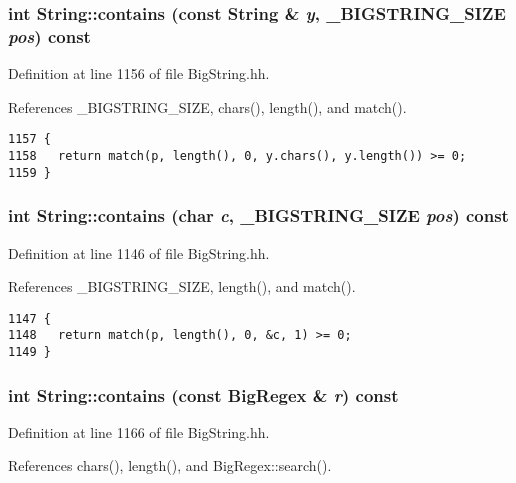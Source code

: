 \subsubsection{\setlength{\rightskip}{0pt plus 5cm}int String::contains (const String \& {\em y}, {\bf \_\-BIGSTRING\_\-SIZE} {\em pos}) const\hspace{0.3cm}{\tt  [inline]}}\label{classString_a38}




Definition at line 1156 of file Big\-String.hh.

References \_\-BIGSTRING\_\-SIZE, chars(), length(), and match().



\footnotesize\begin{verbatim}1157 {
1158   return match(p, length(), 0, y.chars(), y.length()) >= 0;
1159 }
\end{verbatim}\normalsize 
{}
\subsubsection{\setlength{\rightskip}{0pt plus 5cm}int String::contains (char {\em c}, {\bf \_\-BIGSTRING\_\-SIZE} {\em pos}) const\hspace{0.3cm}{\tt  [inline]}}\label{classString_a37}




Definition at line 1146 of file Big\-String.hh.

References \_\-BIGSTRING\_\-SIZE, length(), and match().



\footnotesize\begin{verbatim}1147 {
1148   return match(p, length(), 0, &c, 1) >= 0;
1149 }
\end{verbatim}\normalsize 
{}
\subsubsection{\setlength{\rightskip}{0pt plus 5cm}int String::contains (const {\bf Big\-Regex} \& {\em r}) const\hspace{0.3cm}{\tt  [inline]}}\label{classString_a36}




Definition at line 1166 of file Big\-String.hh.

References chars(), length(), and Big\-Regex::search().




